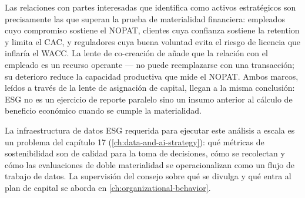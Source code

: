 Las relaciones con partes interesadas que \textcite{freeman2010strategic} identifica como activos
estratégicos son precisamente las que superan la prueba de materialidad financiera: empleados cuyo
compromiso sostiene el NOPAT, clientes cuya confianza sostiene la retention y limita el CAC,
y reguladores cuya buena voluntad evita el riesgo de licencia que inflaría el WACC. La lente de
co-creación de \textcite{vargo2004service} añade que la relación con el empleado es un recurso
operante --- no puede reemplazarse con una transacción; su deterioro reduce la capacidad productiva
que mide el NOPAT. Ambos marcos, leídos a través de la lente de asignación de capital, llegan a la
misma conclusión: ESG no es un ejercicio de reporte paralelo sino un insumo anterior al cálculo de
beneficio económico cuando se cumple la materialidad.

La infraestructura de datos ESG requerida para ejecutar este análisis a escala es un problema del
capítulo 17 (\cref{ch:data-and-ai-strategy}): qué métricas de sostenibilidad son de calidad para
la toma de decisiones, cómo se recolectan y cómo las evaluaciones de doble materialidad se
operacionalizan como un flujo de trabajo de datos. La supervisión del consejo sobre qué se divulga
y qué entra al plan de capital se aborda en \cref{ch:organizational-behavior}.
